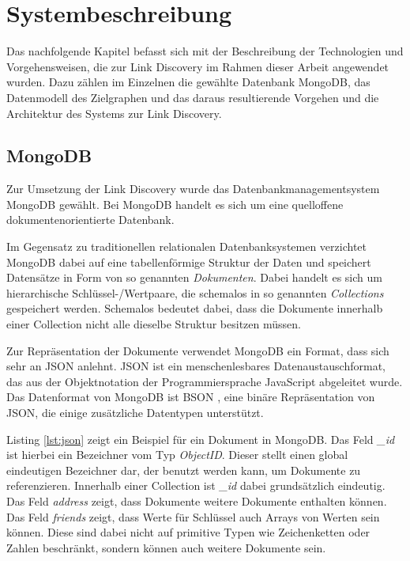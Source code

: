 \chapter{Systembeschreibung}
\label{system}

Das nachfolgende Kapitel befasst sich mit der Beschreibung der Technologien und Vorgehensweisen, die zur Link Discovery im Rahmen dieser Arbeit angewendet wurden. Dazu zählen im Einzelnen die gewählte Datenbank MongoDB, das Datenmodell des Zielgraphen und das daraus resultierende Vorgehen und die Architektur des Systems zur Link Discovery.

\section{MongoDB}
\label{mongo}

Zur Umsetzung der Link Discovery wurde das Datenbankmanagementsystem MongoDB \cite{mo2013} gewählt. Bei MongoDB handelt es sich um eine quelloffene dokumentenorientierte Datenbank.

Im Gegensatz zu traditionellen relationalen Datenbanksystemen verzichtet MongoDB dabei auf eine tabellenförmige Struktur der Daten und speichert Datensätze in Form von so genannten \emph{Dokumenten}. Dabei handelt es sich um hierarchische Schlüssel-/Wertpaare, die schemalos in so genannten \emph{Collections} gespeichert werden. Schemalos bedeutet dabei, dass die Dokumente innerhalb einer Collection nicht alle dieselbe Struktur besitzen müssen.

Zur Repräsentation der Dokumente verwendet MongoDB ein Format, dass sich sehr an JSON \cite{json2006} anlehnt. JSON ist ein menschenlesbares Datenaustauschformat, das aus der Objektnotation der Programmiersprache JavaScript abgeleitet wurde. Das Datenformat von MongoDB ist BSON \cite{bson2013}, eine binäre Repräsentation von JSON, die einige zusätzliche Datentypen unterstützt. 

Listing \ref{lst:json} zeigt ein Beispiel für ein Dokument in MongoDB. Das Feld \emph{\_id} ist hierbei ein  Bezeichner vom Typ \emph{ObjectID}. Dieser stellt einen global eindeutigen Bezeichner dar, der benutzt werden kann, um Dokumente zu referenzieren. Innerhalb einer Collection ist \emph{\_id} dabei grundsätzlich eindeutig. Das Feld \emph{address} zeigt, dass Dokumente weitere Dokumente enthalten können. Das Feld \emph{friends} zeigt, dass Werte für Schlüssel auch Arrays von Werten sein können. Diese sind dabei nicht auf primitive Typen wie Zeichenketten oder Zahlen beschränkt, sondern können auch weitere Dokumente sein.

